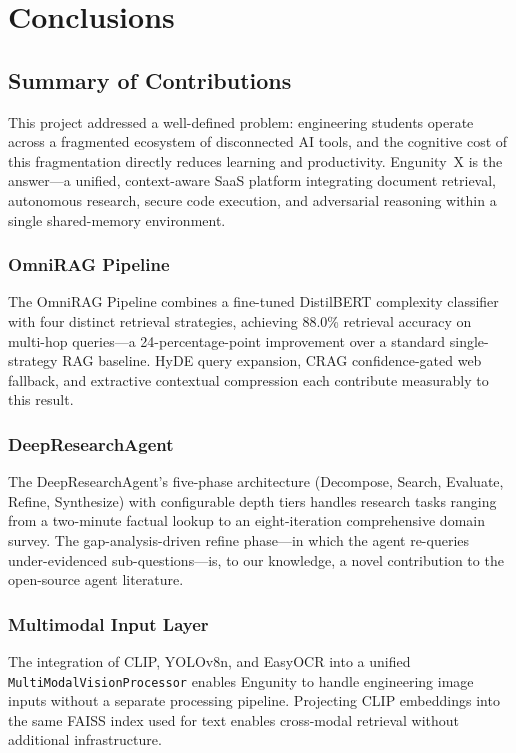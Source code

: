 \chapter{Conclusions}
\label{chap:conclusions}

\section{Summary of Contributions}
\label{sec:contributions-summary}

This project addressed a well-defined problem: engineering students operate across a fragmented ecosystem of disconnected AI tools, and the cognitive cost of this fragmentation directly reduces learning and productivity. Engunity~X is the answer---a unified, context-aware SaaS platform integrating document retrieval, autonomous research, secure code execution, and adversarial reasoning within a single shared-memory environment.

\subsection{OmniRAG Pipeline}
The OmniRAG Pipeline combines a fine-tuned DistilBERT complexity classifier with four distinct retrieval strategies, achieving 88.0\% retrieval accuracy on multi-hop queries---a 24-percentage-point improvement over a standard single-strategy RAG baseline. HyDE query expansion, CRAG confidence-gated web fallback, and extractive contextual compression each contribute measurably to this result.

\subsection{DeepResearchAgent}
The DeepResearchAgent's five-phase architecture (Decompose, Search, Evaluate, Refine, Synthesize) with configurable depth tiers handles research tasks ranging from a two-minute factual lookup to an eight-iteration comprehensive domain survey. The gap-analysis-driven refine phase---in which the agent re-queries under-evidenced sub-questions---is, to our knowledge, a novel contribution to the open-source agent literature.

\subsection{Multimodal Input Layer}
The integration of CLIP, YOLOv8n, and EasyOCR into a unified \texttt{MultiModalVisionProcessor} enables Engunity to handle engineering image inputs without a separate processing pipeline. Projecting CLIP embeddings into the same FAISS index used for text enables cross-modal retrieval without additional infrastructure.

